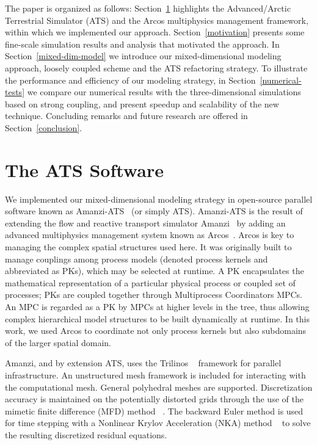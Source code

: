 \documentclass[review]{elsarticle}
\begin{document}
The paper is organized as follows: Section~\ref{arcos-framework} highlights the Advanced/Arctic  Terrestrial Simulator (ATS) and the Arcos multiphysics management framework, within which we implemented our approach. Section~\ref{motivation} presents some fine-scale simulation results and analysis that motivated the approach.  In Section~\ref{mixed-dim-model} we introduce our mixed-dimensional modeling approach, loosely coupled scheme and the ATS refactoring strategy. To illustrate the performance and efficiency of our modeling strategy, in Section~\ref{numerical-tests} we compare our numerical results with the three-dimensional simulations based on strong coupling, and present speedup and scalability of the new technique. Concluding remarks and future research are offered in Section~\ref{conclusion}.

\section{The ATS Software}\label{arcos-framework}

We implemented our mixed-dimensional modeling strategy in open-source parallel software known as Amanzi-ATS~\cite{ats-website} (or simply ATS). Amanzi-ATS is the result of extending the flow and reactive transport  simulator Amanzi~\cite{moulton2012high} by adding an advanced multiphysics management system known as Arcos~\cite{ecoon2016managing}. Arcos is key to managing the complex spatial structures used here. It was originally built to manage couplings among process models (denoted process kernels and abbreviated as PKs), which may be selected at runtime. A PK encapsulates the mathematical representation of a particular physical process or coupled set of processes; PKs are coupled together through Multiprocess Coordinators MPCs. An MPC is regarded as a PK by MPCs at higher levels in the tree, thus allowing complex hierarchical model structures to be built dynamically at runtime. In this work, we used Arcos to coordinate not only process kernels but also subdomains of the larger spatial domain. 

Amanzi, and by extension ATS, uses the Trilinos ~\cite{michael2003trilinos} framework for parallel infrastructure. An unstructured mesh framework \cite{garimella-2014-mstk} is included for interacting with the computational mesh. General polyhedral meshes are supported. Discretization accuracy is maintained on the potentially distorted grids through the use of the mimetic finite difference (MFD) method ~\cite{da2014mimetic, lipnikov2014mimetic}. The backward Euler method is used for time stepping with a Nonlinear Krylov Acceleration (NKA) method ~\cite{calef2013nonlinear, carlson1998design} to solve the resulting discretized residual equations. 
\end{document}
